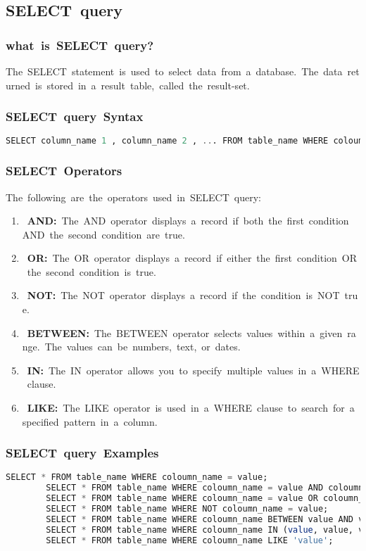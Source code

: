 \documentclass{article}
\begin{document}
	\subsection{\textbf{SELECT query}} 
	\subsubsection{\textbf{what is SELECT query?}} 
	The SELECT statement is used to select data from a database. The data returned is stored in a result table, called the result-set. 
	\subsubsection{\textbf{SELECT query Syntax}} 
	\begin{lstlisting}[language=SQL] 
		SELECT column_name 1 , column_name 2 , ... FROM table_name WHERE coloumn_name = value; 
	\end{lstlisting} 
	
	\subsubsection{\textbf{SELECT Operators}} 
	The following are the operators used in SELECT query: 
	\begin{enumerate} 
		\item \textbf{AND:} The AND operator displays a record if both the first condition AND the second condition are true. 
		\item \textbf{OR:} The OR operator displays a record if either the first condition OR the second condition is true. 
		\item \textbf{NOT:} The NOT operator displays a record if the condition is NOT true. 
		\item \textbf{BETWEEN:} The BETWEEN operator selects values within a given range. The values can be numbers, text, or dates. 
		\item \textbf{IN:} The IN operator allows you to specify multiple values in a WHERE clause. 
		\item \textbf{LIKE:} The LIKE operator is used in a WHERE clause to search for a specified pattern in a column. 
	\end{enumerate} 
	
	\subsubsection{\textbf{SELECT query Examples}} 
	
	\begin{lstlisting}[language=SQL] 
		SELECT * FROM table_name WHERE coloumn_name = value; 
		SELECT * FROM table_name WHERE coloumn_name = value AND coloumn_name = value; 
		SELECT * FROM table_name WHERE coloumn_name = value OR coloumn_name = value; 
		SELECT * FROM table_name WHERE NOT coloumn_name = value; 
		SELECT * FROM table_name WHERE coloumn_name BETWEEN value AND value; 
		SELECT * FROM table_name WHERE coloumn_name IN (value, value, value); 
		SELECT * FROM table_name WHERE coloumn_name LIKE 'value'; 
	\end{lstlisting} 
	
\end{document}
